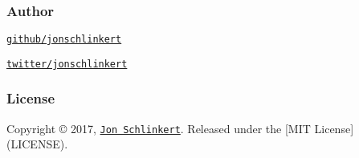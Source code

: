{\ttfamily \subsubsection*{Author}}

{\ttfamily }

{}

{\ttfamily 
\begin{DoxyItemize}
\item \href{https://github.com/jonschlinkert}{\tt github/jonschlinkert}
\item \href{https://twitter.com/jonschlinkert}{\tt twitter/jonschlinkert}
\end{DoxyItemize}}

{\ttfamily \subsubsection*{License}}

{\ttfamily }

{\ttfamily Copyright © 2017, \href{https://github.com/jonschlinkert}{\tt Jon Schlinkert}. Released under the \mbox{[}M\+IT License\mbox{]}(L\+I\+C\+E\+N\+SE).}

{\ttfamily 

}

{ }